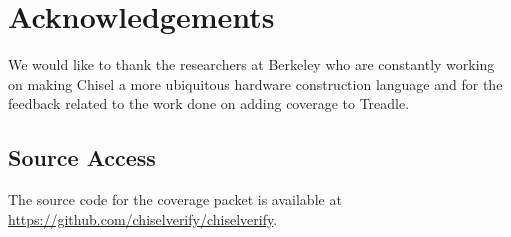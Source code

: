\documentclass[conference]{IEEEtran}
\newcommand{\todo}[1]{{\color{olive} TODO: #1}}
\newcommand{\martin}[1]{{\color{blue} Martin: #1}}
\newcommand{\hjd}[1]{{\color{pink} Hans: #1}}
\begin{document}
\section*{Acknowledgements}
We would like to thank the researchers at Berkeley who are constantly working on making Chisel a more ubiquitous hardware construction language and for the feedback related to the work done on adding coverage to Treadle.

\subsection*{Source Access}
The source code for the coverage packet is available at\\ \url{https://github.com/chiselverify/chiselverify}.



\end{document}
